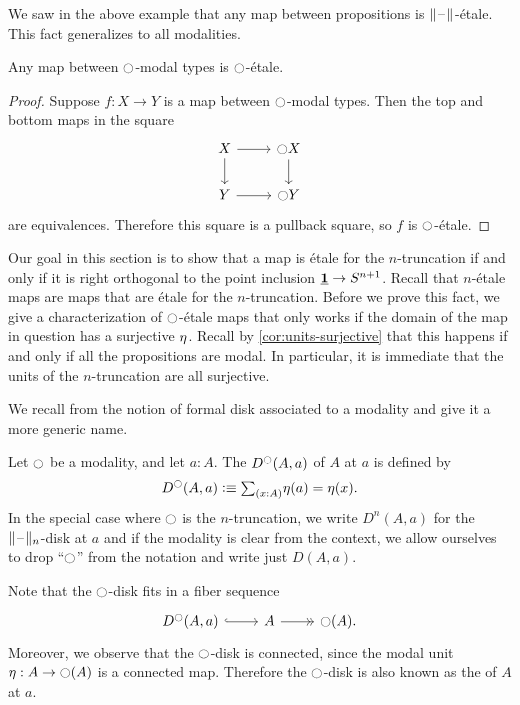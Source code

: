 \documentclass[9pt,twosided]{amsart}
\begin{document}
We saw in the above example that any map between propositions is $\brck{\blank}$-\'etale. This fact generalizes to all modalities.

\begin{lem}\label{lem:etale_modal}
Any map between ${\ocircle}$-modal types is ${\ocircle}$-\'etale.
\end{lem}

\begin{proof}
Suppose $f:X\to Y$ is a map between ${\ocircle}$-modal types. Then the top and bottom maps in the square
\begin{equation*}
\begin{tikzcd}
X \arrow[r] \arrow[d] & \modal X \arrow[d] \\
Y \arrow[r] & \modal Y
\end{tikzcd}
\end{equation*}
are equivalences. Therefore this square is a pullback square, so $f$ is ${\ocircle}$-\'etale.
\end{proof}

Our goal in this section is to show that a map is \'etale for the $n$-truncation if and only if it is right orthogonal to the point inclusion $\underline{\mathbf{1}}\to S^{n+1}$. Recall that $n$-\'etale maps are maps that are \'etale for the $n$-truncation.
Before we prove this fact, we give a characterization of ${\ocircle}$-\'etale maps that only works if the domain of the map in question has a surjective ${\eta_{}}$. Recall by \cref{cor:units-surjective} that this happens if and only if all the propositions are modal. In particular, it is immediate that the units of the $n$-truncation are all surjective.

We recall from \cite{wellen-thesis} the notion of formal disk associated to a modality and give it a more generic name.

\begin{defn}
  Let ${\ocircle}$ be a modality, and let $a:A$. The  $D^{{\ocircle}}(A,a)$ of $A$ at $a$ is defined by
  \begin{equation*}
    D^\modal(A,a)\defeq \sm{x:A}\eta(a)=\eta(x).
  \end{equation*}
  In the special case where ${\ocircle}$ is the $n$-truncation, we write $D^n(A,a)$ for the $\trunc{n}{\blank}$-disk at $a$ and if the modality is clear from the context, we allow ourselves to drop ``${\ocircle}$'' from the notation and write just $D(A,a)$.
\end{defn}

Note that the ${\ocircle}$-disk fits in a fiber sequence
\begin{equation*}
  \begin{tikzcd}
    D^\modal(A,a) \arrow[r,hook] & A \arrow[r,->>] & \modal(A).
  \end{tikzcd}
\end{equation*}
Moreover, we observe that the ${\ocircle}$-disk is connected, since the modal unit $\eta:A\to{\ensuremath{\ocircle}}(A)$ is a connected map. Therefore the ${\ocircle}$-disk is also known as the  of $A$ at $a$.
\end{document}

